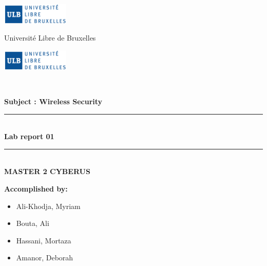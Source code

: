 \documentclass[11pt,a4paper]{report}
\begin{document}
\begin{titlepage}
    \centering
    
	

\begin{minipage}{3cm}
	\begin{center}
		\includegraphics[height=1cm]{LOGO_Universite__libre_bruxelles.png}
	\end{center}
\end{minipage}\hfill
\begin{minipage}{8cm}
    \begin{center}
	
    
	{\small Université Libre de Bruxelles \\ [0.3cm]}
	\end{center}
\end{minipage}\hfill
\begin{minipage}{3cm}
	\begin{center}
		\includegraphics[height=1cm]{LOGO_Universite__libre_bruxelles.png}
	\end{center}
\end{minipage}\hfill\\
\vspace{10mm}


{\large \bfseries{Subject : Wireless Security} \\ }
\begin{center}
   
\end{center}
\vspace{5mm}
\rule{\linewidth}{0.3mm} \\[0.4cm]
{ \huge \bfseries Lab report 01}
\rule{\linewidth}{0.3mm} \\[1cm]
{\large \bfseries{MASTER 2 CYBERUS} \\ }
\vspace{10mm}


\noindent
\begin{flushleft}
\begin{minipage}{0.5\textwidth}
    \vspace{-3mm}
    \begin{flushleft} \large
        \textbf{Accomplished by:} \\[3mm]
        \begin{itemize}
            \item \textsc Ali-Khodja, Myriam
            \item \textsc Bouta, Ali
            \item \textsc Hassani, Mortaza
            \item \textsc Amanor, Deborah
        \end{itemize}
    \end{flushleft}
\end{minipage}
\end{flushleft}


\end{titlepage}
\end{document}
